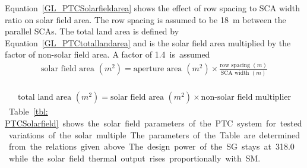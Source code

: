Equation~\ref{GL_PTCSolarfieldarea} shows the effect of row spacing to \ac{SCA} width ratio on solar field area. The row spacing is assumed to be \SI{18}{m} between the parallel \acp{SCA}. The total land area is defined by Equation~\ref{GL_PTCtotallandarea} and is the solar field area multiplied by the factor of non-solar field area. A factor of \SI{1.4} is assumed \cite{NREL2015a}.

\begin{align}
\textrm{solar field area }(m^2) =\textrm{aperture area }(m^2) \times \frac{\textrm{row spacing }(m)}{ \textrm{SCA width }(m)} \label{GL_PTCSolarfieldarea}
\end{align}
\begin{align}
\textrm{total land area }(m^2) =\textrm{solar field area }(m^2) \times  \textrm{non-solar field multiplier}\label{GL_PTCtotallandarea}
\end{align}
Table~\ref{tbl: PTCSolarfield} shows the solar field parameters of the \ac{PTC} system for tested variations of the solar multiple. The parameters of the Table are determined from the relations given above. The design power of the \ac{SG} stays at \SI{318.0}{\mega\wattth} while the solar field thermal output rises proportionally with \ac{SM}. 

